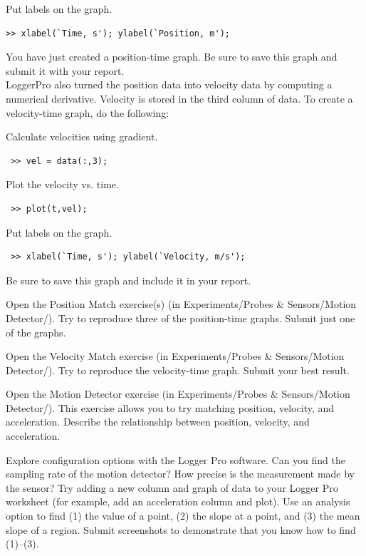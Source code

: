 \documentclass[11pt,letterpaper]{article}
\newcounter{question}[section]
\begin{document}
Put labels on the graph.
\begin{verbatim}>> xlabel(`Time, s'); ylabel(`Position, m');
\end{verbatim}

You have just created a position-time graph. Be sure to save this graph and submit it with your report.\\


LoggerPro also turned the position data into velocity data by computing a numerical derivative. Velocity is stored in the third column of data. To create a velocity-time graph, do the following:

Calculate velocities using gradient.
\begin{verbatim} >> vel = data(:,3);\end{verbatim}

Plot the velocity vs. time.
\begin{verbatim} >> plot(t,vel);\end{verbatim}

Put labels on the graph.
\begin{verbatim} >> xlabel(`Time, s'); ylabel(`Velocity, m/s');
\end{verbatim}
Be sure to save this graph and include it in your report.

\question{} Open the Position Match exercise(s) (in Experiments/Probes \& Sensors/Motion Detector/). Try to reproduce three of the position-time graphs. Submit just one of the graphs.

\question{} Open the Velocity Match exercise (in Experiments/Probes \&
Sensors/Motion Detector/).  Try to reproduce the velocity-time graph. Submit your best result.

\question{} Open the Motion Detector exercise (in Experiments/Probes \& Sensors/Motion Detector/). This exercise allows you to try matching position, velocity, and acceleration. Describe the relationship between position, velocity, and acceleration.\vspace{6cm}


\question{} Explore configuration options with the Logger Pro software.
Can you find the sampling rate of the motion detector? How precise is the measurement made by the sensor? Try adding a new column and graph of data to your Logger Pro worksheet (for example, add an acceleration column and plot).  Use an analysis option
to find (1) the value of a point, (2) the slope at a point, and (3) the mean slope of a region. Submit screenshots to demonstrate that you know how to find (1)--(3).
\end{document}

